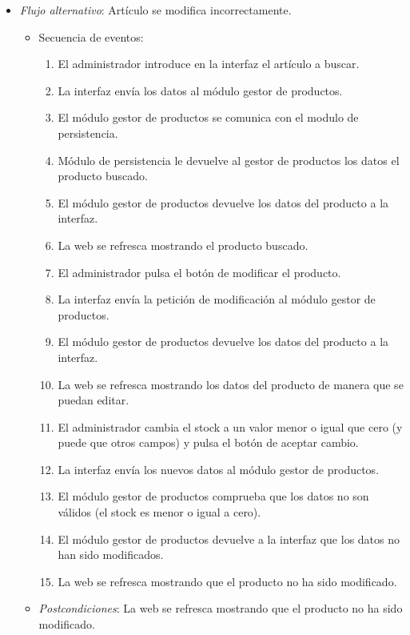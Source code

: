 \begin{enumerate}[{\bf UC-1}]
\begin{itemize}
  \item {\it Flujo alternativo}: Artículo se modifica incorrectamente.

\begin{itemize}
\item Secuencia de eventos:   

    \begin{enumerate}[1. ]
    \item El administrador introduce en la interfaz el artículo a buscar.
    \item La interfaz envía los datos al módulo gestor de productos.
    \item El módulo gestor de productos se comunica con el modulo de persistencia.
    \item Módulo de persistencia le devuelve al gestor de productos los datos el producto buscado.
    \item El módulo gestor de productos devuelve los datos del producto a la interfaz.
    \item La web se refresca mostrando el producto buscado.
    \item El administrador pulsa el botón de modificar el producto.
    \item La interfaz envía la petición de modificación al módulo gestor de productos.
    \item El módulo gestor de productos devuelve los datos del producto a la interfaz.
    \item La web se refresca mostrando los datos  del producto de manera que se puedan editar.
    \item El administrador cambia el stock a un valor menor o igual que cero (y puede que otros campos) y pulsa el botón de aceptar cambio.
    \item La interfaz envía los nuevos datos al módulo gestor de productos.
    \item El módulo gestor de productos comprueba que los datos no son válidos (el stock es menor o igual a cero).
    \item El módulo gestor de productos devuelve a la interfaz que los datos no han sido modificados.
    \item La web se refresca mostrando que el producto no ha sido modificado.
    \end{enumerate}
 \item {\it Postcondiciones}: La web se refresca mostrando que el producto no ha sido modificado.
  \end{itemize}
\end{itemize}

\end{enumerate}



